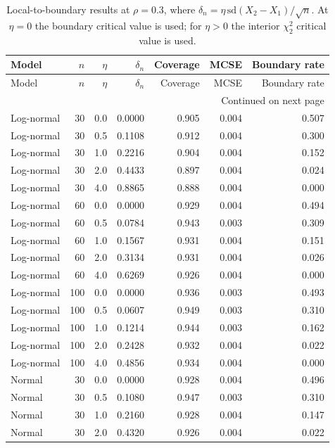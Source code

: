 \documentclass[11pt]{article}
\theoremstyle{remark}
\begin{document}
\begin{longtable}{lrrrrrr}
\caption{Local-to-boundary results at $\rho=0.3$, where $\delta_n=\eta\,\mathrm{sd}(X_2-X_1)/\sqrt n$. At $\eta=0$ the boundary critical value is used; for $\eta>0$ the interior $\chi^2_2$ critical value is used.}\label{tab:local-full}\\
\toprule
Model & $n$ & $\eta$ & $\delta_n$ & Coverage & MCSE & Boundary rate \\
\midrule
\endfirsthead
\toprule
Model & $n$ & $\eta$ & $\delta_n$ & Coverage & MCSE & Boundary rate \\
\midrule
\endhead
\midrule
\multicolumn{7}{r}{Continued on next page}\\
\endfoot
\bottomrule
\endlastfoot
Log-normal & 30 & 0.0 & 0.0000 & 0.905 & 0.004 & 0.507 \\
Log-normal & 30 & 0.5 & 0.1108 & 0.912 & 0.004 & 0.300 \\
Log-normal & 30 & 1.0 & 0.2216 & 0.904 & 0.004 & 0.152 \\
Log-normal & 30 & 2.0 & 0.4433 & 0.897 & 0.004 & 0.024 \\
Log-normal & 30 & 4.0 & 0.8865 & 0.888 & 0.004 & 0.000 \\
Log-normal & 60 & 0.0 & 0.0000 & 0.929 & 0.004 & 0.494 \\
Log-normal & 60 & 0.5 & 0.0784 & 0.943 & 0.003 & 0.309 \\
Log-normal & 60 & 1.0 & 0.1567 & 0.931 & 0.004 & 0.151 \\
Log-normal & 60 & 2.0 & 0.3134 & 0.931 & 0.004 & 0.026 \\
Log-normal & 60 & 4.0 & 0.6269 & 0.926 & 0.004 & 0.000 \\
Log-normal & 100 & 0.0 & 0.0000 & 0.936 & 0.003 & 0.493 \\
Log-normal & 100 & 0.5 & 0.0607 & 0.949 & 0.003 & 0.310 \\
Log-normal & 100 & 1.0 & 0.1214 & 0.944 & 0.003 & 0.162 \\
Log-normal & 100 & 2.0 & 0.2428 & 0.932 & 0.004 & 0.022 \\
Log-normal & 100 & 4.0 & 0.4856 & 0.934 & 0.004 & 0.000 \\
Normal & 30 & 0.0 & 0.0000 & 0.928 & 0.004 & 0.496 \\
Normal & 30 & 0.5 & 0.1080 & 0.947 & 0.003 & 0.310 \\
Normal & 30 & 1.0 & 0.2160 & 0.928 & 0.004 & 0.147 \\
Normal & 30 & 2.0 & 0.4320 & 0.926 & 0.004 & 0.022 \\

\end{longtable}
\end{document}
